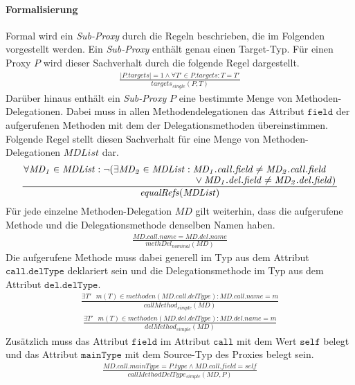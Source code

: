 \documentclass[a4paper,12pt]{article}
\begin{document}
\paragraph{Formalisierung}
Formal wird ein \emph{Sub-Proxy} durch die Regeln beschrieben, die im Folgenden vorgestellt werden. Ein \emph{Sub-Proxy} enthält genau einen Target-Typ. Für einen Proxy $P$ wird dieser Sachverhalt durch die folgende Regel dargestellt.
\begin{gather*}
\frac{|\mathit{P.targets}| = 1 \wedge \forall \mathit{T'} \in \mathit{P.targets}: T = T'}{\mathit{targets_{single}(P,T)}}
\end{gather*}
Darüber hinaus enthält ein \emph{Sub-Proxy} $P$ eine bestimmte Menge von Methoden-Delegationen. Dabei muss in allen Methodendelegationen das Attribut $\texttt{field}$ der aufgerufenen Methoden mit dem der Delegationsmethoden übereinstimmen. Folgende Regel stellt diesen Sachverhalt für eine Menge von Methoden-Delegationen $\mathit{MDList}$ dar.
\begin{gather*}
\frac{\splitfrac{\forall \mathit{MD_1}\in \mathit{MDList}: \neg(\exists \mathit{MD_2} \in \mathit{MDList}:\mathit{MD_1.call.field} \neq \mathit{MD_2.call.field}}{ \vee \mathit{MD_1.del.field} \neq \mathit{MD_2.del.field} )}}
{\mathit{equalRefs(MDList)}}
\end{gather*}
Für jede einzelne Methoden-Delegation $\mathit{MD}$ gilt weiterhin, dass die aufgerufene Methode und die Delegationsmethode denselben Namen haben.
\begin{gather*}
\frac{\mathit{MD.call.name} = \mathit{MD.del.name}}
{\mathit{methDel_{nominal}(MD)}}
\end{gather*}
Die aufgerufene Methode muss dabei generell im Typ aus dem Attribut $\texttt{call.delType}$ deklariert sein und die Delegationsmethode im Typ aus dem Attribut $\texttt{del.delType}$.
\begin{gather*}
\frac{\exists \mathit{T'\text{ } m(T)} \in \mathit{methoden(MD.call.delType)}: \mathit{MD.call.name} = m}
{\mathit{callMethod_{simple}(MD)}}
\end{gather*}
\begin{gather*}
\frac{\exists \mathit{T'\text{ }m(T)} \in \mathit{methoden(MD.del.delType)}: \mathit{MD.del.name} = m}
{\mathit{delMethod_{simple}(MD)}}
\end{gather*}
Zusätzlich muss das Attribut $\texttt{field}$ im Attribut $\texttt{call}$ mit dem Wert $\texttt{self}$ belegt und das Attribut $\texttt{mainType}$ mit dem Source-Typ des Proxies belegt sein.
\begin{gather*}
\frac{\mathit{MD.call.mainType} = \mathit{P.type} \wedge \mathit{MD.call.field} = \mathit{self}}
{\mathit{callMethodDelType_{simple}(MD, P)}}
\end{gather*}
\end{document}
